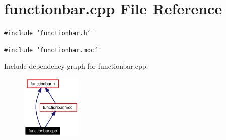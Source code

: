 \section{functionbar.cpp File Reference}
\label{functionbar_8cpp}


{\tt \#include \char`\"{}functionbar.h\char`\"{}}\par
{\tt \#include \char`\"{}functionbar.moc\char`\"{}}\par


Include dependency graph for functionbar.cpp:\begin{figure}[H]
\begin{center}
\leavevmode
\includegraphics[width=80pt]{functionbar_8cpp__incl}
\end{center}
\end{figure}
